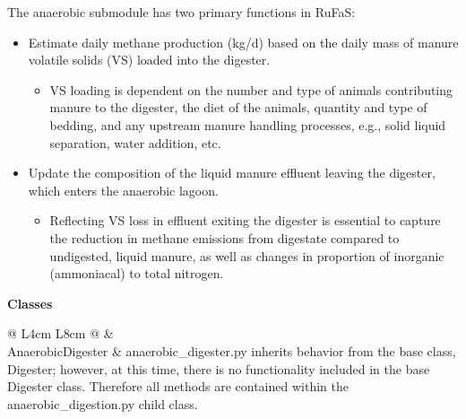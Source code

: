 \begin{refsection}
The anaerobic submodule has two primary functions in RuFaS: 
    \begin{itemize}
        \item Estimate daily methane production (kg/d) based on the daily mass of manure volatile solids (VS) loaded into the digester.
        \begin{itemize}
            \item VS loading is dependent on the number and type of animals contributing manure to the digester, the diet of the animals, quantity and type of bedding, and any upstream manure handling processes, e.g., solid liquid separation, water addition, etc.
        \end{itemize}
        \item Update the composition of the liquid manure effluent leaving the digester, which enters the anaerobic lagoon. 
        \begin{itemize}
            \item Reflecting VS loss in effluent exiting the digester is essential to capture the reduction in methane emissions from digestate compared to undigested, liquid manure, as well as changes in proportion of inorganic (ammoniacal) to total nitrogen.
        \end{itemize}
    \end{itemize}


\newpage
\textbf{Classes}
\vspace{0.2cm}

    \begin{table}[h!]
    \centering
    \renewcommand{\arraystretch}{1.3}
    \begin{center}
        \caption{List of Python classes for anaerobic digestors.}
    \end{center}
    \vspace{-0.2cm}
    
    \begin{tabular}{@{} L{4cm} L{8cm}  @{}}
    \toprule
     & 
     \\
    \midrule
    AnaerobicDigester  & anaerobic\_digester.py inherits behavior from the base class, Digester; however, at this time, there is no functionality included in the base Digester class. Therefore all methods are contained within the anaerobic\_digestion.py child class. \\

    \bottomrule
    \end{tabular}
    \end{table}  


\end{refsection}
